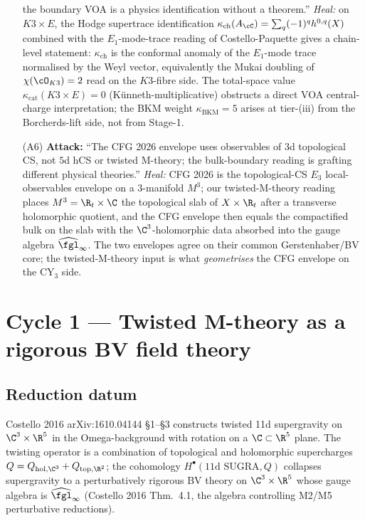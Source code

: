 \begin{enumerate}
the boundary VOA is a physics identification without a theorem.''
\emph{Heal:} on $K3 \times E$, the Hodge supertrace identification
$\kappa_{\mathrm{ch}}(A_\cC) = \sum_q (-1)^q h^{0,q}(X)$ combined with
the $E_1$-mode-trace reading of Costello-Paquette gives a chain-level
statement: $\kappa_{\mathrm{ch}}$ is the conformal anomaly of the
$E_1$-mode trace normalised by the Weyl vector, equivalently the Mukai
doubling of $\chi(\cO_{K3}) = 2$ read on the $K3$-fibre side. The
total-space value $\kappa_{\mathrm{cat}}(K3 \times E) = 0$
(K\"unneth-multiplicative) obstructs a direct VOA central-charge
interpretation; the BKM weight $\kappa_{\mathrm{BKM}} = 5$ arises at
tier-(iii) from the Borcherds-lift side, not from Stage-1.
\item[(A6)] \textbf{Attack:} ``The CFG 2026 envelope uses observables of
$3$d topological CS, not $5$d hCS or twisted M-theory; the
bulk-boundary reading is grafting different physical theories.''
\emph{Heal:} CFG 2026 is the topological-CS $E_3$ local-observables
envelope on a $3$-manifold $M^3$; our twisted-M-theory reading places
$M^3 = \R_t \times \C$ the topological slab of $X \times \R_t$ after a
transverse holomorphic quotient, and the CFG envelope then equals the
compactified bulk on the slab with the $\C^3$-holomorphic data absorbed
into the gauge algebra $\widehat{\fgl}_\infty$. The two envelopes
agree on their common Gerstenhaber/BV core; the twisted-M-theory
input is what \emph{geometrises} the CFG envelope on the CY$_3$ side.
\end{enumerate}

\section{Cycle 1 --- Twisted M-theory as a rigorous BV field theory}
\label{sec:agent12-twisted-m-theory-rigorous}

\subsection*{Reduction datum}

Costello 2016 arXiv:1610.04144 \S1--\S3 constructs twisted 11d
supergravity on $\C^3 \times \R^5$ in the Omega-background with
rotation on a $\C \subset \R^5$ plane. The twisting operator is a
combination of topological and holomorphic supercharges
$Q = Q_{\mathrm{hol},\C^3} + Q_{\mathrm{top},\R^2}$; the cohomology
$H^\bullet(11\text{d SUGRA}, Q)$ collapses supergravity to a
perturbatively rigorous BV theory on $\C^3 \times \R^5$ whose gauge
algebra is $\widehat{\fgl}_\infty$ (Costello 2016 Thm.~4.1, the
algebra controlling M2/M5 perturbative reductions).

